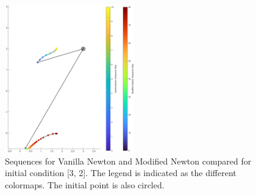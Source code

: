 \vspace{1cm}
\begin{figure}[!ht]
    \centering
    \includegraphics[width = 0.5\textwidth]{Images/Fenton_32_total.png}
    \caption{Sequences for Vanilla Newton and Modified Newton compared for initial condition [3, 2]. The legend is indicated as the different colormaps. The initial point is also circled. }
    \label{fig:total4}
\end{figure}

\clearpage

